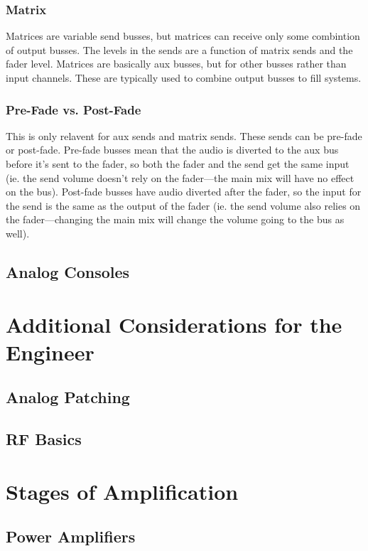 \documentclass[a4paper]{article}
\begin{document}
\subsubsection{Matrix}
Matrices are variable send busses, but matrices can receive only some
combintion of output busses. The levels in the sends are a function of matrix
sends and the fader level. Matrices are basically aux busses, but for other
busses rather than input channels. These are typically used to combine output
busses to fill systems.

\subsubsection{Pre-Fade vs. Post-Fade}
This is only relavent for aux sends and matrix sends. These sends can be
pre-fade or post-fade. Pre-fade busses mean that the audio is diverted to the
aux bus before it's sent to the fader, so both the fader and the send get
the same input (ie. the send volume doesn't rely on the fader---the main mix
will have no effect on the bus). Post-fade
busses have audio diverted after the fader, so the input for the send is the
same as the output of the fader (ie. the send volume also relies on the
fader---changing the main mix will change the volume going to the bus as well).

\subsection{Analog Consoles}

\section[Additional Considerations]{Additional Considerations for the Engineer}

\subsection{Analog Patching}

\subsection{RF Basics}

\section{Stages of Amplification}

\subsection{Power Amplifiers}
\end{document}
